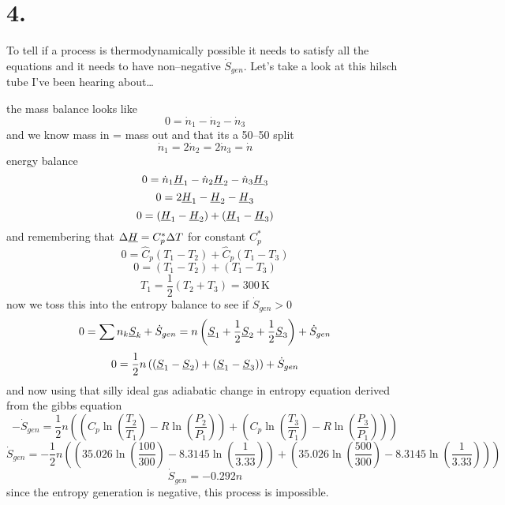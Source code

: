 \documentclass{article}
\begin{document}
\section*{4.}
To tell if a process is thermodynamically possible it needs to satisfy all the equations and it needs to have non--negative $\dot{S}_{gen}$. Let's take a look at this hilsch tube I've been hearing about\dots
\begin{center}
\end{center}
the mass balance looks like
\[ 0 = \dot{n}_{1} - \dot{n}_{2} - \dot{n}_{3}  \]
and we know mass in = mass out and that its a 50--50 split
\[ \dot{n}_1 = 2 \dot{n}_2 = 2 \dot{n}_3 = \dot{n} \]
energy balance
\[ 0 = \dot{n}_{1} \underbar{$H$}_1 - \dot{n}_{2} \underbar{$H$}_2 - \dot{n}_{3} \underbar{$H$}_3 \]
\[ 0 = 2 \underbar{$H$}_1 -  \underbar{$H$}_2 -  \underbar{$H$}_3 \]
\[ 0 =  \left(\underbar{$H$}_1 -  \underbar{$H$}_2\right) + \left(\underbar{$H$}_1 -  \underbar{$H$}_3\right) \]
and remembering that $\Delta \underbar{$H$} = {C}_p^* \Delta T$ for constant $C_p^*$
\[ 0 = \hat{C}_p \left(T_1 - T_2\right) + \hat{C}_p \left(T_1 - T_3\right) \]
\[ 0 =  \left(T_1 - T_2\right) +  \left(T_1 - T_3\right) \]
\[ T_1 = \frac{1}{2} \left(T_2 + T_3\right) = 300\,\text{K} \]
now we toss this into the entropy balance to see if $\dot{S}_{gen}>0$
\[ 0 = \sum n_k \underbar{$S$}_k  + \dot{S}_{gen} = n\left( \underbar{$S$}_1 + \frac{1}{2}\underbar{$S$}_2 + \frac{1}{2} \underbar{$S$}_3 \right) + \dot{S}_{gen} \]
\[ 0 = \frac{1}{2}n \left(\left(\underbar{$S$}_1 - \underbar{$S$}_2\right) + \left(\underbar{$S$}_1 - \underbar{$S$}_3\right)\right) + \dot{S}_{gen} \]
and now using that silly ideal gas adiabatic change in entropy equation derived from the gibbs equation
\[ -\dot{S}_{gen} = \frac{1}{2}n\left(\left(C_p \ln\left(\frac{T_2}{T_1}\right) - R \ln \left(\frac{P_2}{P_1}\right)\right) +\left(C_p \ln\left(\frac{T_3}{T_1}\right) - R \ln \left(\frac{P_3}{P_1}\right)\right) \right) \]
\[ \dot{S}_{gen} = -\frac{1}{2}n\left(\left(35.026 \ln\left(\frac{100}{300}\right) - 8.3145 \ln \left(\frac{1}{3.33}\right)\right) +\left(35.026 \ln\left(\frac{500}{300}\right) - 8.3145 \ln \left(\frac{1}{3.33}\right)\right) \right) \]
\[ \dot{S}_{gen} = -0.292n \]
since the entropy generation is negative, this process is impossible.
\end{document}
